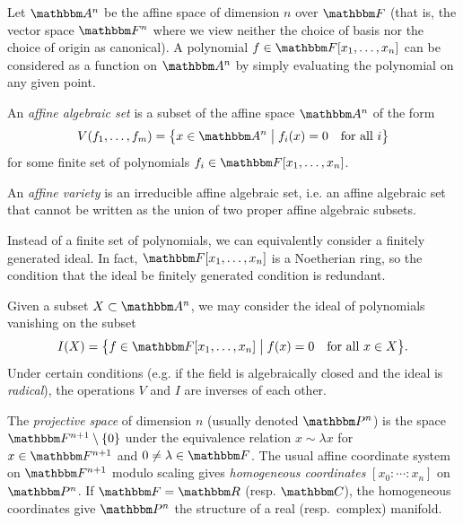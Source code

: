 \documentclass[11pt,titlepage]{article}
\newcommand*{\vbar}{\;\big\vert\;}
\numberwithin{equation}{section}
\begin{document}
    Let $\A^n$ be the affine space of dimension $n$ over $\F$ (that is, the
    vector space $\F^n$ where we view neither the choice of basis nor the choice
    of origin as canonical).  A polynomial $f \in \F[x_1, \ldots, x_n]$ can be
    considered as a function on $\A^n$ by simply evaluating the polynomial on
    any given point.

    \begin{definition}
        An \emph{affine algebraic set} is a subset of the affine space $\A^n$
        of the form
        \[
            V(f_1, \ldots, f_m)
            = \cdil[\big]{x \in \A^n \vbar f_i(x) = 0 \quad\text{for all $i$}}
        \]
        for some finite set of polynomials $f_i \in \F[x_1, \ldots, x_n]$.

        An \emph{affine variety} is an irreducible affine algebraic set, i.e. an
        affine algebraic set that cannot be written as the union of two proper
        affine algebraic subsets.
    \end{definition}
    \noindent Instead of a finite set of polynomials, we can equivalently
    consider a finitely generated ideal.  In fact, $\F[x_1,\ldots,x_n]$ is a
    Noetherian ring, so the condition that the ideal be finitely generated
    condition is redundant.

    Given a subset $X \subset \A^n$, we may consider the ideal of polynomials
    vanishing on the subset
    \[
        I(X) = \cdil[\big]{f \in \F[x_1, \ldots, x_n] \vbar f(x) = 0 \quad\text{for
        all $x \in X$}}.
    \]
    Under certain conditions (e.g. if the field is algebraically closed and the
    ideal is \emph{radical}), the operations $V$ and $I$ are inverses of each other.

    \begin{definition}
        The \emph{projective space} of dimension $n$ (usually denoted $\Proj^n$)
        is the space $\F^{n+1}\setminus \{0\}$ under the equivalence relation $x
        \sim \lambda x$ for $x \in \F^{n+1}$ and $0 \ne \lambda \in \F$.  The
        usual affine coordinate system on $\F^{n+1}$ modulo scaling gives
        \emph{homogeneous coordinates} $[x_0: \cdots: x_n]$ on $\Proj^n$.  If
        $\F = \R$ (resp.  $\C$), the homogeneous coordinates give $\Proj^n$ the
        structure of a real (resp.\ complex) manifold.
    \end{definition}
\end{document}
